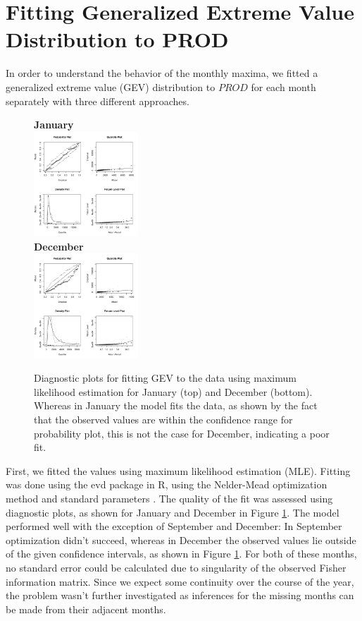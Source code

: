 \documentclass[10pt,conference,compsocconf]{IEEEtran}
\begin{document}
\section*{Fitting Generalized Extreme Value Distribution to PROD}
In order to understand the behavior of the monthly maxima, we fitted a generalized extreme value (GEV) distribution to $PROD$ for each month separately with three different approaches. 
\begin{figure}
	\centering
	\textbf{January}\\
	\includegraphics[width=0.35\textwidth]{../plots/monthly_mle_diag/01_monthly_mle_diag.pdf}\\
	\textbf{December}\\
	\includegraphics[width=0.35\textwidth]{../plots/monthly_mle_diag/12_monthly_mle_diag.pdf}
	\caption{Diagnostic plots for fitting GEV to the data using maximum likelihood estimation for January (top) and December (bottom). Whereas in January the model fits the data, as shown by the fact that the observed values are within the confidence range for probability plot, this is not the case for December, indicating a poor fit.}
	\label{fig:mle_diag}
\end{figure}
\par
First, we fitted the values using maximum likelihood estimation (MLE). Fitting was done using the evd package in R, using the Nelder-Mead optimization method and standard parameters \cite{evd}. The quality of the fit was assessed using diagnostic plots, as shown for January and December in Figure \ref{fig:mle_diag}. The model performed well with the exception of September and December: In September optimization didn't succeed, whereas in December the observed values lie outside of the given confidence intervals, as shown in Figure \ref{fig:mle_diag}. For both of these months, no standard error could be calculated due to singularity of the observed Fisher information matrix. Since we expect some continuity over the course of the year, the problem wasn't further investigated as inferences for the missing months can be made from their adjacent months. 
\end{document}
